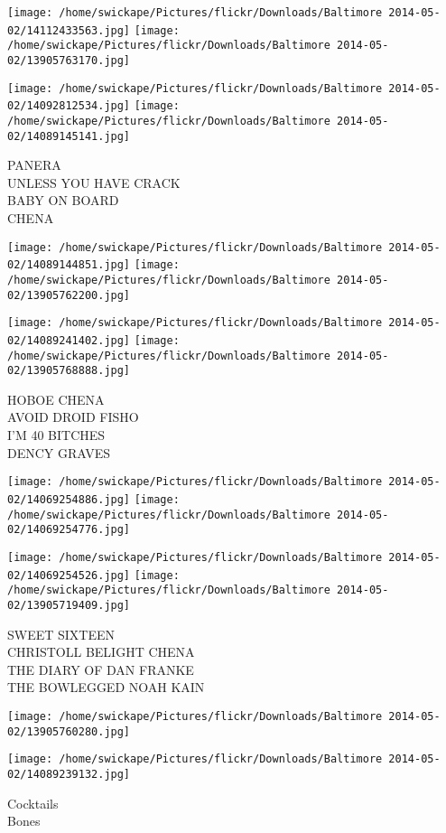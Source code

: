 \documentclass[10pt,letterpaper]{article}
\begin{document}
\texttt{[image: /home/swickape/Pictures/flickr/Downloads/Baltimore 2014-05-02/14112433563.jpg]}
\texttt{[image: /home/swickape/Pictures/flickr/Downloads/Baltimore 2014-05-02/13905763170.jpg]}

\texttt{[image: /home/swickape/Pictures/flickr/Downloads/Baltimore 2014-05-02/14092812534.jpg]}
\texttt{[image: /home/swickape/Pictures/flickr/Downloads/Baltimore 2014-05-02/14089145141.jpg]}

PANERA\\
UNLESS YOU HAVE CRACK\\
BABY ON BOARD\\
CHENA\\
\pagebreak

\texttt{[image: /home/swickape/Pictures/flickr/Downloads/Baltimore 2014-05-02/14089144851.jpg]}
\texttt{[image: /home/swickape/Pictures/flickr/Downloads/Baltimore 2014-05-02/13905762200.jpg]}

\texttt{[image: /home/swickape/Pictures/flickr/Downloads/Baltimore 2014-05-02/14089241402.jpg]}
\texttt{[image: /home/swickape/Pictures/flickr/Downloads/Baltimore 2014-05-02/13905768888.jpg]}

HOBOE CHENA\\
AVOID DROID FISHO\\
I'M 40 BITCHES\\
DENCY GRAVES\\
\pagebreak

\texttt{[image: /home/swickape/Pictures/flickr/Downloads/Baltimore 2014-05-02/14069254886.jpg]}
\texttt{[image: /home/swickape/Pictures/flickr/Downloads/Baltimore 2014-05-02/14069254776.jpg]}

\texttt{[image: /home/swickape/Pictures/flickr/Downloads/Baltimore 2014-05-02/14069254526.jpg]}
\texttt{[image: /home/swickape/Pictures/flickr/Downloads/Baltimore 2014-05-02/13905719409.jpg]}

SWEET SIXTEEN\\
CHRISTOLL BELIGHT CHENA\\
THE DIARY OF DAN FRANKE\\
THE BOWLEGGED NOAH KAIN\\
\pagebreak

\texttt{[image: /home/swickape/Pictures/flickr/Downloads/Baltimore 2014-05-02/13905760280.jpg]}

\vspace{0.25in}
\texttt{[image: /home/swickape/Pictures/flickr/Downloads/Baltimore 2014-05-02/14089239132.jpg]}

Cocktails\\
Bones\\
\pagebreak
\end{document}
